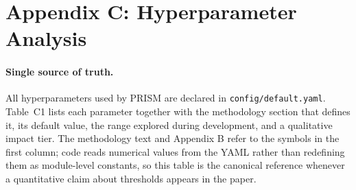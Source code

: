 
\section{Appendix C: Hyperparameter Analysis}

\paragraph{Single source of truth.} All hyperparameters used by PRISM are declared in \texttt{config/default.yaml}. Table~C1 lists each parameter together with the methodology section that defines it, its default value, the range explored during development, and a qualitative impact tier. The methodology text and Appendix B refer to the symbols in the first column; code reads numerical values from the YAML rather than redefining them as module-level constants, so this table is the canonical reference whenever a quantitative claim about thresholds appears in the paper.

